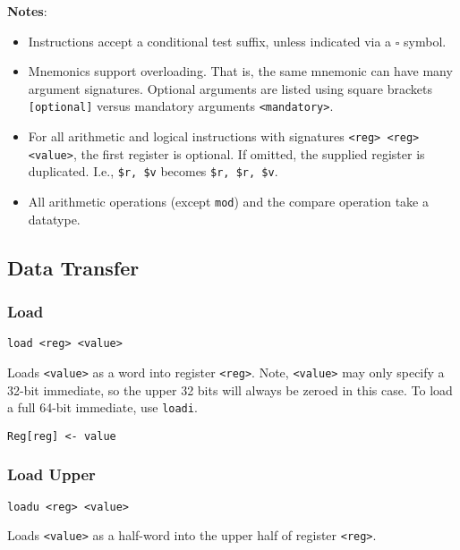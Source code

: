 \textbf{Notes}:

\begin{itemize}
    \item Instructions accept a conditional test suffix, unless indicated via a \(\square\) symbol.
    \item Mnemonics support overloading.
    That is, the same mnemonic can have many argument signatures.
    Optional arguments are listed using square brackets \texttt{[optional]} versus mandatory arguments \texttt{<mandatory>}.
    \item For all arithmetic and logical instructions with signatures \texttt{<reg> <reg> <value>}, the first register is optional.
    If omitted, the supplied register is duplicated.
    I.e., \texttt{\$r, \$v} becomes \texttt{\$r, \$r, \$v}.
    \item All arithmetic operations (except \texttt{mod}) and the compare operation take a datatype.
\end{itemize}

\subsection{Data Transfer}

\subsubsection{Load}

\begin{lstlisting}[style=assembly]
    load <reg> <value>
\end{lstlisting}

Loads \texttt{<value>} as a word into register \texttt{<reg>}.
Note, \texttt{<value>} may only specify a 32-bit immediate, so the upper 32 bits will always be zeroed in this case.
To load a full 64-bit immediate, use \texttt{loadi}.

\begin{lstlisting}[style=rtn]
    Reg[reg] <- value
\end{lstlisting}

\subsubsection{Load Upper}

\begin{lstlisting}[style=assembly]
    loadu <reg> <value>
\end{lstlisting}

Loads \texttt{<value>} as a half-word into the upper half of register \texttt{<reg>}.

